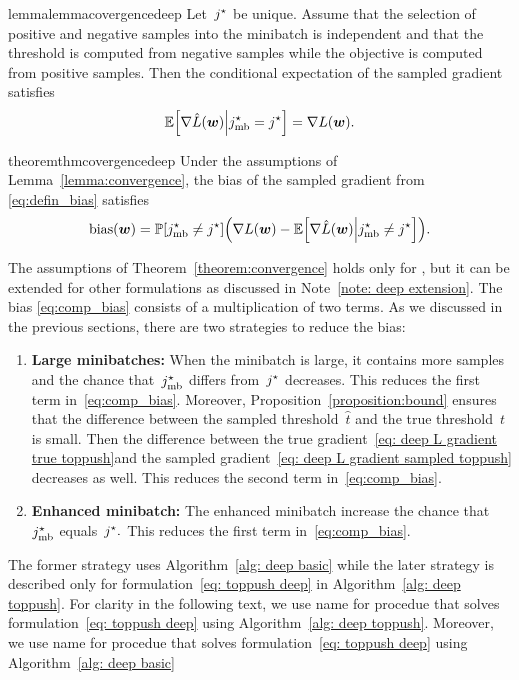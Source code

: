 \begin{restatable}{lemma}{lemmacovergencedeep}\label{lemma:convergence}
  Let~$j^{\star}$ be unique. Assume that the selection of positive and negative samples into the minibatch is independent and that the threshold is computed from negative samples while the objective is computed from positive samples. Then the conditional expectation of the sampled gradient satisfies
  \begin{equation*}
    \EE\Brac[s]{\nabla \hat{L}(\bm{w}) \middle\vert\indmaxmb=\indmax} =  \nabla L(\bm{w}).
  \end{equation*}
\end{restatable}

\begin{restatable}{theorem}{thmcovergencedeep}\label{theorem:convergence}
  Under the assumptions of Lemma~\ref{lemma:convergence}, the bias of the sampled gradient from \eqref{eq:defin_bias} satisfies
  \begin{equation}\label{eq:comp_bias}
    \bias(\bm{w}) = \PP\Brac[s]{\indmaxmb\neq \indmax} \Brac{\nabla L(\bm{w}) - \EE\Brac[s]{\nabla \hat{L}(\bm{w}) \middle\vert \indmaxmb\neq \indmax}}.
  \end{equation}
\end{restatable}

The assumptions of Theorem~\ref{theorem:convergence} holds only for \TopPush, but it can be extended for other formulations as discussed in Note~\ref{note: deep extension}. The bias \eqref{eq:comp_bias} consists of a multiplication of two terms. As we discussed in the previous sections, there are two strategies to reduce the bias:
\begin{enumerate}
  \item \textbf{Large minibatches:} When the minibatch is large, it contains more samples and the chance that~$j^{\star}_{\text{mb}}$ differs from~$j^{\star}$ decreases. This reduces the first term in~\eqref{eq:comp_bias}. Moreover, Proposition~\ref{proposition:bound} ensures that the difference between the sampled threshold~$\hat{t}$ and the true threshold~$t$ is small. Then the difference between the true gradient~\eqref{eq: deep L gradient true toppush}and the sampled gradient~\eqref{eq: deep L gradient sampled toppush} decreases as well. This reduces the second term in~\eqref{eq:comp_bias}.
  \item \textbf{Enhanced minibatch:} The enhanced minibatch increase the chance that~$j^{\star}_{\text{mb}}$ equals~$j^{\star}.$ This reduces the first term in~\eqref{eq:comp_bias}. 
\end{enumerate}
The former strategy uses Algorithm~\ref{alg: deep basic} while the later strategy is described only for formulation~\eqref{eq: toppush deep} in Algorithm~\ref{alg: deep toppush}. For clarity in the following text, we use name \DeepTopPush for procedue that solves formulation~\eqref{eq: toppush deep} using Algorithm~\ref{alg: deep toppush}. Moreover, we use name \TopPush for procedue that solves formulation~\eqref{eq: toppush deep} using Algorithm~\ref{alg: deep basic}

